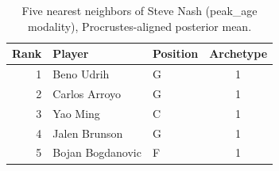 \begin{table}[htbp]
  \centering\small
  \begin{tabular}{rllc}
    \toprule
    Rank & Player & Position & Archetype \\
    \midrule
    1 & Beno Udrih & G & 1 \\
    2 & Carlos Arroyo & G & 1 \\
    3 & Yao Ming & C & 1 \\
    4 & Jalen Brunson & G & 1 \\
    5 & Bojan Bogdanovic & F & 1 \\
    \bottomrule
  \end{tabular}
  \caption{Five nearest neighbors of Steve Nash (peak_age modality), Procrustes-aligned posterior mean.}
  \label{tab:Steve_Nash_neighbors_peak_age}
\end{table}

